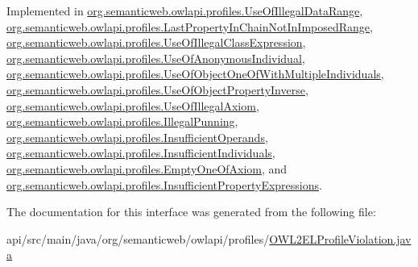 Implemented in \hyperlink{classorg_1_1semanticweb_1_1owlapi_1_1profiles_1_1_use_of_illegal_data_range_afb3fd710675197a52af34d435e200a11}{org.\-semanticweb.\-owlapi.\-profiles.\-Use\-Of\-Illegal\-Data\-Range}, \hyperlink{classorg_1_1semanticweb_1_1owlapi_1_1profiles_1_1_last_property_in_chain_not_in_imposed_range_a0589795148c909d91e1b8cb9fca037f7}{org.\-semanticweb.\-owlapi.\-profiles.\-Last\-Property\-In\-Chain\-Not\-In\-Imposed\-Range}, \hyperlink{classorg_1_1semanticweb_1_1owlapi_1_1profiles_1_1_use_of_illegal_class_expression_a89b0b7eb0b60b3c459be385d61a5b111}{org.\-semanticweb.\-owlapi.\-profiles.\-Use\-Of\-Illegal\-Class\-Expression}, \hyperlink{classorg_1_1semanticweb_1_1owlapi_1_1profiles_1_1_use_of_anonymous_individual_ab03814cc2bf452ca4f7047dfea2275e8}{org.\-semanticweb.\-owlapi.\-profiles.\-Use\-Of\-Anonymous\-Individual}, \hyperlink{classorg_1_1semanticweb_1_1owlapi_1_1profiles_1_1_use_of_object_one_of_with_multiple_individuals_ada95e356026ce8e7e849045477e949df}{org.\-semanticweb.\-owlapi.\-profiles.\-Use\-Of\-Object\-One\-Of\-With\-Multiple\-Individuals}, \hyperlink{classorg_1_1semanticweb_1_1owlapi_1_1profiles_1_1_use_of_object_property_inverse_a552c22f4007aeffb4d9726e693112439}{org.\-semanticweb.\-owlapi.\-profiles.\-Use\-Of\-Object\-Property\-Inverse}, \hyperlink{classorg_1_1semanticweb_1_1owlapi_1_1profiles_1_1_use_of_illegal_axiom_ac716b38b80f413dff770651cb4c2de83}{org.\-semanticweb.\-owlapi.\-profiles.\-Use\-Of\-Illegal\-Axiom}, \hyperlink{classorg_1_1semanticweb_1_1owlapi_1_1profiles_1_1_illegal_punning_ade7bd6f3090bea429762e86a942c43c9}{org.\-semanticweb.\-owlapi.\-profiles.\-Illegal\-Punning}, \hyperlink{classorg_1_1semanticweb_1_1owlapi_1_1profiles_1_1_insufficient_operands_a1b0585c8d1d4bd9921e6a4f6b734fc2a}{org.\-semanticweb.\-owlapi.\-profiles.\-Insufficient\-Operands}, \hyperlink{classorg_1_1semanticweb_1_1owlapi_1_1profiles_1_1_insufficient_individuals_ace467aac8e22bbc717bd539a3beb7969}{org.\-semanticweb.\-owlapi.\-profiles.\-Insufficient\-Individuals}, \hyperlink{classorg_1_1semanticweb_1_1owlapi_1_1profiles_1_1_empty_one_of_axiom_ae140f7e672309c5a9e67af1c5ebe548f}{org.\-semanticweb.\-owlapi.\-profiles.\-Empty\-One\-Of\-Axiom}, and \hyperlink{classorg_1_1semanticweb_1_1owlapi_1_1profiles_1_1_insufficient_property_expressions_a46f4d0da88775a056908eb490054fc55}{org.\-semanticweb.\-owlapi.\-profiles.\-Insufficient\-Property\-Expressions}.



The documentation for this interface was generated from the following file\-:\begin{DoxyCompactItemize}
\item 
api/src/main/java/org/semanticweb/owlapi/profiles/\hyperlink{_o_w_l2_e_l_profile_violation_8java}{O\-W\-L2\-E\-L\-Profile\-Violation.\-java}\end{DoxyCompactItemize}
